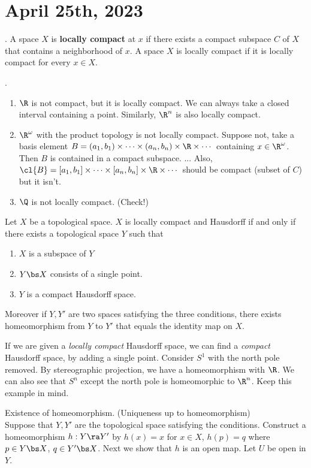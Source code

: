 \section*{April 25th, 2023}


.  A space \(X\) is \textbf{locally compact} at \(x\) if there exists a compact subspace \(C\) of \(X\) that contains a neighborhood of \(x\). A space \(X\) is locally compact if it is locally compact for every \(x \in X\).

\ex.
\begin{enumerate}
    \item \(\R\) is not compact, but it is locally compact. We can always take a closed interval containing a point. Similarly, \(\R^n\) is also locally compact.
    \item \(\R^\omega\) with the product topology is not locally compact. Suppose not, take a basis element \(B = (a_1, b_1) \times \cdots \times (a_n, b_n) \times \R \times \cdots\) containing \(x \in \R^\omega\). Then \(B\) is contained in a compact subspace. ... Also, \(\cl{B} = [a_1, b_1] \times \cdots \times [a_n, b_n] \times \R \times \cdots\) should be compact (subset of \(C\)) but it isn't.
    \item \(\Q\) is not locally compact. (Check!)
\end{enumerate}

 Let \(X\) be a topological space. \(X\) is locally compact and Hausdorff if and only if there exists a topological space \(Y\) such that
\begin{enumerate}
    \item \(X\) is a subspace of \(Y\)
    \item \(Y \bs X\) consists of a single point.
    \item \(Y\) is a compact Hausdorff space.
\end{enumerate}
Moreover if \(Y, Y'\) are two spaces satisfying the three conditions, there exists homeomorphism from \(Y\) to \(Y'\) that equals the identity map on \(X\).

If we are given a \textit{locally compact} Hausdorff space, we can find a \textit{compact} Hausdorff space, by adding a single point. Consider \(S^1\) with the north pole removed. By stereographic projection, we have a homeomorphism with \(\R\). We can also see that \(S^n\) except the north pole is homeomorphic to \(\R^n\). Keep this example in mind.

\pf {} Existence of homeomorphism. (Uniqueness up to homeomorphism) \\
Suppose that \(Y, Y'\) are the topological space satisfying the conditions. Construct a homeomorphism \(h : Y \ra Y'\) by \(h(x) = x\) for \(x \in X\), \(h(p) = q\) where \(p \in Y \bs X\), \(q \in Y' \bs X\). Next we show that \(h\) is an open map. Let \(U\) be open in \(Y\).

